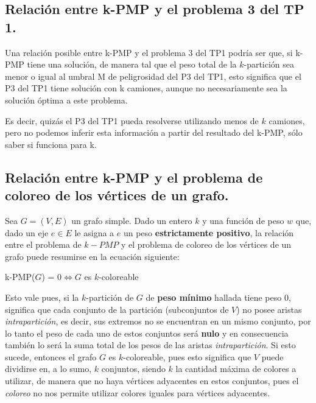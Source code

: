 \subsection{Relación entre k-PMP y el problema 3 del TP 1.}
\vspace*{0.3cm}

Una relación posible entre k-PMP y el problema 3 del TP1 podría ser que, si
k-PMP tiene una solución, de manera tal que el peso total de la $k$-partición sea menor o igual al umbral M de peligrosidad del P3 del TP1, esto significa que el P3 del TP1 tiene solución con k camiones, aunque no necesariamente sea la solución óptima a este problema.

Es decir, quizás el P3 del TP1 pueda resolverse utilizando menos de $k$ camiones, pero no podemos inferir esta información a partir del resultado del k-PMP, sólo saber si funciona para k.


\newpage
\subsection{Relación entre k-PMP y el problema de coloreo de los vértices de
            un grafo.}
\vspace*{0.3cm}

Sea $G = (V, E)$ un grafo simple. Dado un entero $k$ y una función de peso $w$
que, dado un eje $e \in E$ le asigna a $e$ un peso \textbf{estrictamente positivo},
la relación entre el problema de $k-PMP$ y el problema de coloreo de los vértices
de un grafo puede resumirse en la ecuación siguiente:

\begin{center}
  k-PMP($G$) = $0 \iff G$ es $k$-coloreable
\end{center}

Esto vale pues, si la $k$-partición de $G$ de \textbf{peso mínimo} hallada
tiene peso $0$, significa que cada conjunto de la partición (subconjuntos de $V$)
no posee aristas \textit{intrapartición}, es decir, sus extremos no se encuentran en
un mismo conjunto, por lo tanto el peso de cada uno de estos conjuntos será
\textbf{nulo} y en consecuencia también lo será la suma total de los pesos de
las aristas \textit{intrapartición}. Si esto sucede, entonces el grafo $G$ es
$k$-coloreable, pues esto significa que $V$ puede dividirse en, a lo sumo, $k$
conjuntos, siendo $k$ la cantidad máxima de colores a utilizar, de manera que no
haya vértices adyacentes en estos conjuntos, pues el \textit{coloreo} no nos permite
utilizar colores iguales para vértices adyacentes.

